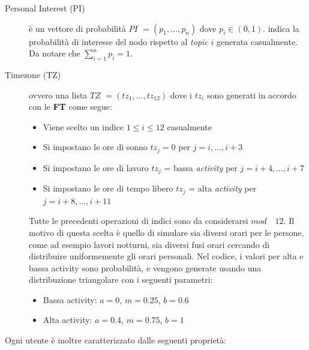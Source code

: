 \documentclass[a4paper,12pt]{article}
\begin{document}
\begin{description}
  \item[Personal Interest (PI)] \`e un vettore di probabilità $PI$ 
    $=(p_1, \dots, p_n)$ dove $p_i \in (0, 1)$.
    indica la probabilit\`a di interesse del nodo rispetto al 
    \textit{topic} $i$ generata casualmente. Da notare che $\sum_{i=1}^n p_i = 1$.
  \item[Timezone (TZ)] ovvero una lista $TZ$ $=(tz_1, \dots, tz_{12}) $
  dove i $tz_i$ sono generati in accordo con le \textbf{FT} 
  come segue:
  \begin{itemize}
    \item Viene scelto un indice $1\leq i \leq 12$ casualmente
    \item Si impostano le ore di sonno $tz_j = 0$ per $j = i, \dots , i+3$
    \item Si impostano le ore di lavoro $tz_j$ = bassa \textit{activity} per 
      $j = i+4, \dots , i+7$
    \item Si impostano le ore di tempo libero $tz_j$ = alta \textit{activity}
      per $j = i+8, \dots , i+11$
  \end{itemize}
  Tutte le precedenti operazioni di indici sono da considerarsi 
  $mod \quad 12$. Il motivo di questa scelta \`e quello di simulare
  sia diversi orari per le persone, come ad esempio lavori notturni, sia diversi fusi orari cercando di distribuire uniformemente gli orari personali. Nel codice, i valori per alta e bassa activity sono probabilità, e vengono generate usando una distribuzione triangolare con i seguenti parametri:
  \begin{itemize}
  \item Bassa activity: $a = 0$, $m = 0.25$, $b = 0.6$  
  \item Alta activity: $a = 0.4$, $m = 0.75$, $b = 1$ 
  \end{itemize}
\end{description}
Ogni utente \`e inoltre caratterizzato dalle seguenti propriet\`a:
\end{document}

